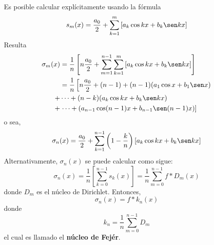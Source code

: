 \documentclass[12pt]{report}
\theoremstyle{largebreak}
\begin{document}
    Es posible calcular explícitamente usando la fórmula
    \begin{equation*}
        s_m(x)=\frac{a_0}{2}+\sum_{ k=1}^{m}\left[a_k\cos kx+b_k\sen kx \right]
    \end{equation*}
    Resulta
    \begin{equation*}
        \begin{split}
            \sigma_m(x)&=\frac{1}{n}\left[n\frac{a_0}{2}+\sum_{m=1}^{ n-1}\sum_{ k=1}^{m}\left[a_k\cos kx+b_k\sen kx \right] \right]\\
            &=\frac{1}{n}\left[n\frac{a_0}{2}+(n-1)+(n-1)(a_1\cos x+b_1\sen x)\right.\\
            +&\cdots+(n-k)(a_k\cos kx+b_k\sen kx)\\
            +&\left. \cdots+(a_{ n-1}\cos (n-1)x+b_{ n-1}\sen(n-1)x)\right] \\
        \end{split}
    \end{equation*}
    o sea,
    \begin{equation*}
        \sigma_n(x)=\frac{a_0}{2}+\sum_{ k=1}^{n-1}\left(1-\frac{k}{n} \right)\left[a_k\cos kx+b_k\sen kx \right]
    \end{equation*}
    Alternativamente, $\sigma_n(x)$ se puede calcular como sigue:
    \begin{equation*}
        \sigma_n(x)=\frac{1}{n}\left[\sum_{ k=0}^{ n-1}s_k(x) \right]=\frac{1}{n}\sum_{ m=0}^{ n-1}f*D_m(x)
    \end{equation*}
    donde $D_m$ es el núcleo de Dirichlet. Entonces,
    \begin{equation*}
        \sigma_n(x)=f*k_n(x)
    \end{equation*}
    donde
    \begin{equation*}
        k_n=\frac{1}{n}\sum_{ m=0}^{ n-1}D_m
    \end{equation*}
    el cual es llamado el \textbf{núcleo de Fejér}.
\end{document}
